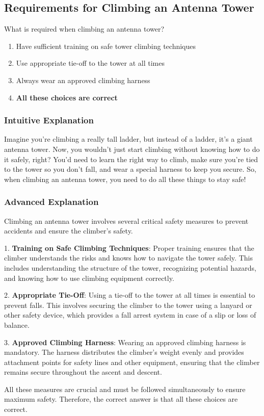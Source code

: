 \subsection{Requirements for Climbing an Antenna Tower}
\label{T0B02}

\begin{tcolorbox}[colback=gray!10!white,colframe=black!75!black,title=T0B02]
What is required when climbing an antenna tower?
\begin{enumerate}[label=\Alph*)]
    \item Have sufficient training on safe tower climbing techniques
    \item Use appropriate tie-off to the tower at all times
    \item Always wear an approved climbing harness
    \item \textbf{All these choices are correct}
\end{enumerate}
\end{tcolorbox}

\subsubsection{Intuitive Explanation}
Imagine you're climbing a really tall ladder, but instead of a ladder, it's a giant antenna tower. Now, you wouldn't just start climbing without knowing how to do it safely, right? You'd need to learn the right way to climb, make sure you're tied to the tower so you don't fall, and wear a special harness to keep you secure. So, when climbing an antenna tower, you need to do all these things to stay safe!

\subsubsection{Advanced Explanation}
Climbing an antenna tower involves several critical safety measures to prevent accidents and ensure the climber's safety. 

1. \textbf{Training on Safe Climbing Techniques}: Proper training ensures that the climber understands the risks and knows how to navigate the tower safely. This includes understanding the structure of the tower, recognizing potential hazards, and knowing how to use climbing equipment correctly.

2. \textbf{Appropriate Tie-Off}: Using a tie-off to the tower at all times is essential to prevent falls. This involves securing the climber to the tower using a lanyard or other safety device, which provides a fall arrest system in case of a slip or loss of balance.

3. \textbf{Approved Climbing Harness}: Wearing an approved climbing harness is mandatory. The harness distributes the climber's weight evenly and provides attachment points for safety lines and other equipment, ensuring that the climber remains secure throughout the ascent and descent.

All these measures are crucial and must be followed simultaneously to ensure maximum safety. Therefore, the correct answer is that all these choices are correct.

